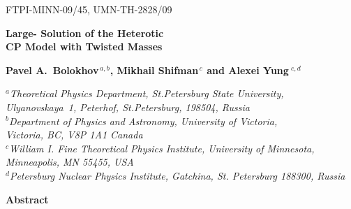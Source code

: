 \documentclass[epsfig,12pt]{article}
\begin{document}



\begin{titlepage}

\begin{flushright}
FTPI-MINN-09/45, UMN-TH-2828/09\\
\end{flushright}


\begin{center}
{  \Large \bf  Large- Solution of the Heterotic\\[2mm]
 CP Model with Twisted Masses}
\end{center}



\vspace{10mm}

\begin{center}

 {\large
 \bf   Pavel A.~Bolokhov$^{\,a,b}$,  Mikhail Shifman$^{\,c}$ and \bf Alexei Yung$^{\,\,c,d}$}
\end {center}

\begin{center}

$^a${\it Theoretical Physics Department, St.Petersburg State University, Ulyanovskaya~1, 
	 Peterhof, St.Petersburg, 198504, Russia}\\
$^b${\it Department of Physics and Astronomy, University of Victoria,\\
    Victoria, BC, V8P 1A1 Canada}\\
$^c${\it  William I. Fine Theoretical Physics Institute,
University of Minnesota,
Minneapolis, MN 55455, USA}\\
$^{d}${\it Petersburg Nuclear Physics Institute, Gatchina, St. Petersburg
188300, Russia
}
\end{center}


\begin{center}
{\large\bf Abstract}
\end{center}


\end{titlepage}
\end{document}
